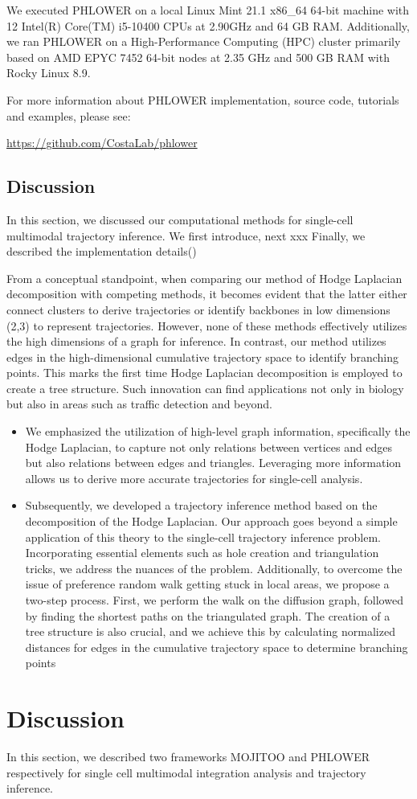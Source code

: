 We executed PHLOWER on a local Linux Mint 21.1 x86\_64 64-bit machine with 12 Intel(R) Core(TM) i5-10400 CPUs at 2.90GHz and 64 GB RAM. Additionally, we ran PHLOWER on a High-Performance Computing (HPC) cluster primarily based on AMD EPYC 7452 64-bit nodes at 2.35 GHz and 500 GB RAM with Rocky Linux 8.9.

For more information about PHLOWER implementation, source code, tutorials and examples, please see:
\begin{center}
\url{https://github.com/CostaLab/phlower}
\end{center}

\subsection{Discussion}
In this section, we discussed our computational methods for single-cell multimodal trajectory inference. We first introduce, next xxx
Finally, we described the implementation details(\sref{})

From a conceptual standpoint, when comparing our method of Hodge Laplacian decomposition with competing methods, it becomes evident that the latter either connect clusters to derive trajectories or identify backbones in low dimensions (2,3) to represent trajectories. However, none of these methods effectively utilizes the high dimensions of a graph for inference. In contrast, our method utilizes edges in the high-dimensional cumulative trajectory space to identify branching points. This marks the first time Hodge Laplacian decomposition is employed to create a tree structure. Such innovation can find applications not only in biology but also in areas such as traffic detection and beyond.

\begin{itemize}
    \item We emphasized the utilization of high-level graph information, specifically the Hodge Laplacian, to capture not only relations between vertices and edges but also relations between edges and triangles. Leveraging more information allows us to derive more accurate trajectories for single-cell analysis.

    \item Subsequently, we developed a trajectory inference method based on the decomposition of the Hodge Laplacian. Our approach goes beyond a simple application of this theory to the single-cell trajectory inference problem. Incorporating essential elements such as hole creation and triangulation tricks, we address the nuances of the problem. Additionally, to overcome the issue of preference random walk getting stuck in local areas, we propose a two-step process. First, we perform the walk on the diffusion graph, followed by finding the shortest paths on the triangulated graph. The creation of a tree structure is also crucial, and we achieve this by calculating normalized distances for edges in the cumulative trajectory space to determine branching points

\end{itemize}


\section{Discussion}
In this section, we described two frameworks MOJITOO and PHLOWER respectively for single cell multimodal integration analysis and trajectory inference.
